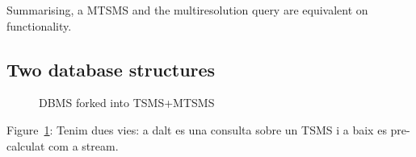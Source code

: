 Summarising, a MTSMS and the multiresolution query are equivalent on
functionality.



\subsection{Two database structures}
\todo{}






\begin{figure}
  \centering
  
  \caption{DBMS forked into TSMS+MTSMS}
  \label{fig:model:mtsms-tsms}
\end{figure}

Figure~\ref{fig:model:mtsms-tsms}:
Tenim dues vies: a dalt es una consulta sobre un TSMS i a baix es pre-calculat com a stream.















 












